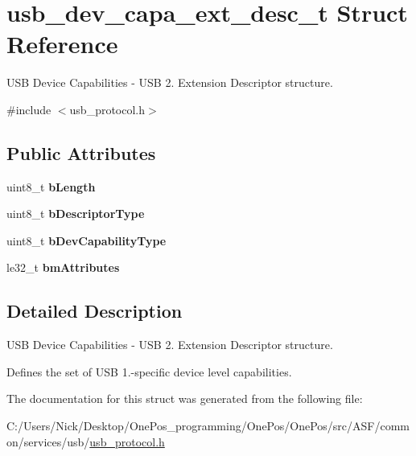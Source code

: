\hypertarget{structusb__dev__capa__ext__desc__t}{\section{usb\-\_\-dev\-\_\-capa\-\_\-ext\-\_\-desc\-\_\-t Struct Reference}
\label{structusb__dev__capa__ext__desc__t}
}


U\-S\-B Device Capabilities -\/ U\-S\-B 2. Extension Descriptor structure.  




{\ttfamily \#include $<$usb\-\_\-protocol.\-h$>$}

\subsection*{Public Attributes}
\begin{DoxyCompactItemize}
\item 
\hypertarget{structusb__dev__capa__ext__desc__t_a735ba2237f8ceb5b79ac436a8267e1b8}{uint8\-\_\-t {\bfseries b\-Length}}\label{structusb__dev__capa__ext__desc__t_a735ba2237f8ceb5b79ac436a8267e1b8}

\item 
\hypertarget{structusb__dev__capa__ext__desc__t_a89791db7ee5ac9bb1306b66a22697a09}{uint8\-\_\-t {\bfseries b\-Descriptor\-Type}}\label{structusb__dev__capa__ext__desc__t_a89791db7ee5ac9bb1306b66a22697a09}

\item 
\hypertarget{structusb__dev__capa__ext__desc__t_a6845e9ac0d09760158d6fb0b0bf8bdb8}{uint8\-\_\-t {\bfseries b\-Dev\-Capability\-Type}}\label{structusb__dev__capa__ext__desc__t_a6845e9ac0d09760158d6fb0b0bf8bdb8}

\item 
\hypertarget{structusb__dev__capa__ext__desc__t_abb480487616d0e018339437ceaec0c92}{le32\-\_\-t {\bfseries bm\-Attributes}}\label{structusb__dev__capa__ext__desc__t_abb480487616d0e018339437ceaec0c92}

\end{DoxyCompactItemize}


\subsection{Detailed Description}
U\-S\-B Device Capabilities -\/ U\-S\-B 2. Extension Descriptor structure. 

Defines the set of U\-S\-B 1.-\/specific device level capabilities. 

The documentation for this struct was generated from the following file\-:\begin{DoxyCompactItemize}
\item 
C\-:/\-Users/\-Nick/\-Desktop/\-One\-Pos\-\_\-programming/\-One\-Pos/\-One\-Pos/src/\-A\-S\-F/common/services/usb/\hyperlink{usb__protocol_8h}{usb\-\_\-protocol.\-h}\end{DoxyCompactItemize}
